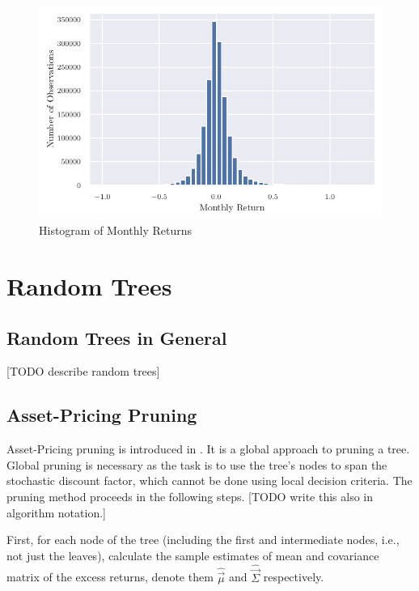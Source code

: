 	
	\begin{center}
		\begin{figure}
			\includegraphics{Figures/hist_returns.pdf}
			\caption{Histogram of Monthly Returns}
			\label{fig:hist_returns}
		\end{figure}
	\end{center}

\section{Random Trees}

	\subsection{Random Trees in General} 
		
		[TODO describe random trees]

	\subsection{Asset-Pricing Pruning}
		
		Asset-Pricing pruning is introduced in \cite{bryzgalova2019forest}. 
		It is a global approach to pruning a tree. Global pruning is necessary as the task is to use the tree's nodes to span the stochastic discount factor, which cannot be done using local decision criteria. The pruning method proceeds in the following steps. [TODO write this also in algorithm notation.]
		 
		First, for each node of the tree (including the first and intermediate nodes, i.e., not just the leaves), calculate the sample estimates of mean and covariance matrix of the excess returns, denote them $\hat{\vec{\mu}}$ and $\hat{\vec{\Sigma}}$ respectively.
		
